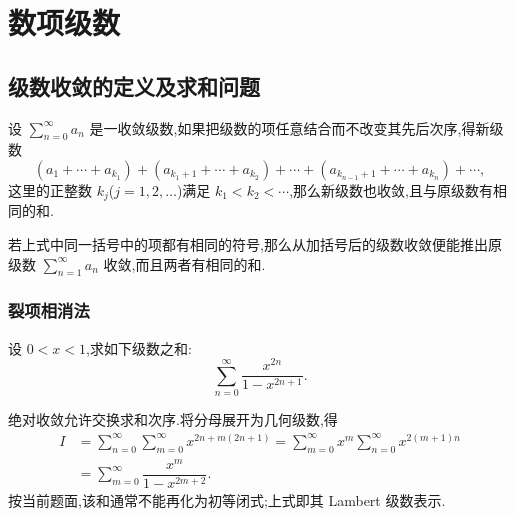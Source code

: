 \setcounter{chapter}{7}
\pagestyle{fancy}

\chapter{数项级数}


\section{级数收敛的定义及求和问题}

\begin{theorem}
    设 $\displaystyle\sum\limits_{n=0}^{\infty}a_n$ 是一收敛级数,如果把级数的项任意结合而不改变其先后次序,得新级数
    \[
        (a_1+\cdots+a_{k_1})+(a_{k_1+1}+\cdots+a_{k_2})+\cdots
        +(a_{k_{n-1}+1}+\cdots+a_{k_n})+\cdots,
    \]
    这里的正整数 $k_j$($j=1,2,\ldots$)满足 $k_1<k_2<\cdots$,那么新级数也收敛,且与原级数有相同的和.
\end{theorem}

\begin{theorem}[\markstar]
    若上式中同一括号中的项都有相同的符号,那么从加括号后的级数收敛便能推出原级数 $\displaystyle\sum\limits_{n=1}^{\infty}a_n$ 收敛,而且两者有相同的和.
\end{theorem}



\subsection{裂项相消法}

\begin{example}
    设 $0<x<1$,求如下级数之和:
    \[
        \displaystyle\sum\limits_{n=0}^{\infty}\dfrac{x^{2n}}{1-x^{2n+1}}.
    \]
\end{example}
\exampleblank

\begin{solution}
    绝对收敛允许交换求和次序.将分母展开为几何级数,得
    \[
        \begin{aligned}
            I & =\sum\limits_{n=0}^{\infty}\sum\limits_{m=0}^{\infty}
            x^{2n+m(2n+1)}
            =\sum\limits_{m=0}^{\infty}x^m
            \sum\limits_{n=0}^{\infty}x^{2(m+1)n}                           \\
              & =\boxed{\sum\limits_{m=0}^{\infty}\dfrac{x^m}{1-x^{2m+2}}}.
        \end{aligned}
    \]
    按当前题面,该和通常不能再化为初等闭式;上式即其 Lambert 级数表示.
\end{solution}

